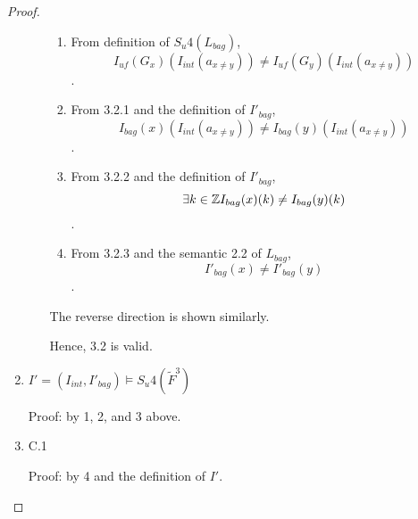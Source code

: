 \begin{proof}
\begin{enumerate}[1.]
\begin{enumerate}[3.1]
\begin{enumerate}[3.2.1]
\item %
From definition of $S_{u}4(L_{bag})$,
$$I_{\textit{uf}}(G_{x})(I_{int}(a_{x\neq y})) \neq I_{\textit{uf}}(G_{y})(I_{int}(a_{x\neq y}))$$.

\item %
From 3.2.1 and the definition of $I'_{bag}$,
$$I_{bag}(x)(I_{int}(a_{x\neq y})) \neq I_{bag}(y)(I_{int}(a_{x\neq y}))$$.

\item %
From 3.2.2 and the definition of $I'_{bag}$,
$$\exists k \in \mathbb{Z} I_{bag}(x)(k) \neq I_{bag}(y)(k)$$.

\item %
From 3.2.3 and the semantic 2.2 of $L_{bag}$,
$$I'_{bag}(x) \neq I'_{bag}(y)$$.

\end{enumerate}
The reverse direction is shown similarly.

Hence, 3.2 is valid.

\end{enumerate} %

\item %
$I'=(I_{int},I'_{bag})\models S_{u}4(\tilde{F}^3)$

Proof: by 1, 2, and 3 above.


\item %
C.1

Proof: by 4 and the definition of $I'$.

\end{enumerate}
\end{proof}

